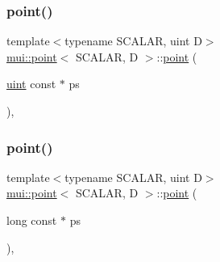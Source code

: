 \mbox{\label{structmui_1_1point_aabafbe7f1a4aceab4c2663f5ec407ee2}} 
\subsubsection{\texorpdfstring{point()}{point()}\hspace{0.1cm}{\footnotesize\ttfamily [11/15]}}
{\footnotesize\ttfamily template$<$typename S\+C\+A\+L\+AR, uint D$>$ \\
\hyperlink{structmui_1_1point}{mui\+::point}$<$ S\+C\+A\+L\+AR, D $>$\+::\hyperlink{structmui_1_1point}{point} (\begin{DoxyParamCaption}\item[{\hyperlink{namespacemui_af15a3e7188a2117fb9965277bb0cacd2}{uint} const $\ast$}]{ps }\end{DoxyParamCaption})\hspace{0.3cm}{\ttfamily [inline]}, {\ttfamily [explicit]}}

\mbox{\label{structmui_1_1point_ade60cb2a6851bf67c20688c0c4578dc0}} 
\subsubsection{\texorpdfstring{point()}{point()}\hspace{0.1cm}{\footnotesize\ttfamily [12/15]}}
{\footnotesize\ttfamily template$<$typename S\+C\+A\+L\+AR, uint D$>$ \\
\hyperlink{structmui_1_1point}{mui\+::point}$<$ S\+C\+A\+L\+AR, D $>$\+::\hyperlink{structmui_1_1point}{point} (\begin{DoxyParamCaption}\item[{long const $\ast$}]{ps }\end{DoxyParamCaption})\hspace{0.3cm}{\ttfamily [inline]}, {\ttfamily [explicit]}}

\mbox{\label{structmui_1_1point_a2d64f04067003752bc9afb443550a676}} 
